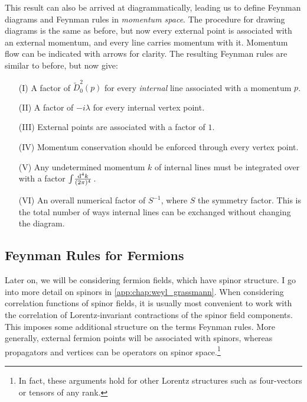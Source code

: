 \documentclass[../main.tex]{subfiles}
\begin{document}
This result can also be arrived at diagrammatically, leading us to define Feynman diagrams and Feynman rules in \emph{momentum space}.
The procedure for drawing diagrams is the same as before, but now every external point is associated with an external momentum, and every line carries momentum with it.
Momentum flow can be indicated with arrows for clarity.
The resulting Feynman rules are similar to before, but now give:
\begin{itemize}
  \item [(I)] A factor of \(\tilde{D}_0^2(p)\) for every \emph{internal} line associated with a momentum \(p\).
  \item [(II)] A factor of \(-i\lambda\) for every internal vertex point.
  \item [(III)] External points are associated with a factor of \(1\).
  \item [(IV)] Momentum conservation should be enforced through every vertex point.
  \item [(V)] Any undetermined momentum \(k\) of internal lines must be integrated over with a factor \(\int\!\frac{\mathrm{d}^{4}k}{(2\pi)^{4}}\,\).
  \item [(VI)] An overall numerical factor of \(S^{-1}\), where \(S\) the symmetry factor. This is the total number of ways internal lines can be exchanged without changing the diagram.
\end{itemize}


\subsection{Feynman Rules for Fermions}
Later on, we will be considering fermion fields, which have spinor structure.
I go into more detail on spinors in \cref{app:chap:weyl_grassmann}.
When considering correlation functions of spinor fields, it is usually most convenient to work with the correlation of Lorentz-invariant contractions of the spinor field components.
This imposes some additional structure on the terms Feynman rules.
More generally, external fermion points will be associated with spinors, whereas propagators and vertices can be operators on spinor space.\footnote{In fact, these arguments hold for other Lorentz structures such as four-vectors or tensors of any rank.}
\end{document}
